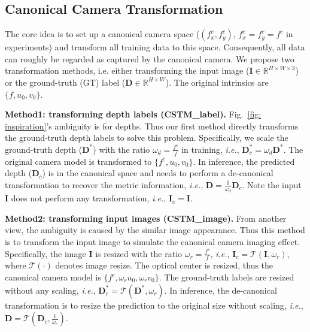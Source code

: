 \subsection{Canonical Camera Transformation}
The core idea is to set up a canonical camera space ($(f_{x}^{c}, f_{y}^{c})$, $f_{x}^{c}=f_{y}^{c}=f^{c}$ in experiments) and transform all training data to this space. 
Consequently, all data can roughly be regarded as captured by the canonical camera.
We propose two transformation methods, i.e. either transforming the input image ($\mathbf{I}\in\mathbb{R}^{H \times W \times 3}$) or the ground-truth (GT) label ($\mathbf{D}\in\mathbb{R}^{H \times W}$). The original intrinsics are $\{f, u_{0}, v_{0}\}$.

\noindent\textbf{Method1: transforming depth labels (CSTM\_label).}
Fig.~\ref{fig: inspiration}'s ambiguity is for depths. 
Thus our first method directly transforms the ground-truth depth labels to solve this problem.  Specifically, we scale the ground-truth depth ($\mathbf{D}^{*}$) with the ratio $\omega_d = \frac{f^{c}}{f}$ in training, \textit{i.e.},  $\mathbf{D}^{*}_{c} = \omega_d \mathbf{D}^{*}$. The original camera model is transformed to $\{f^{c}, u_{0}, v_{0}\}$. In inference, the predicted depth ($\mathbf{D}_{c}$) is in the canonical space and needs to perform a de-canonical transformation to recover the metric information, \textit{i.e.}, $\mathbf{D} = \frac{1}{\omega_d}\mathbf{D}_{c}$. Note the input $\mathbf{I}$ does not perform any transformation, \textit{i.e.},  $\mathbf{I}_c = \mathbf{I}$.

\noindent\textbf{Method2: transforming input images (CSTM\_image).}
From another view, the ambiguity is caused by the similar image appearance. Thus this method is to transform the input image to simulate the canonical camera imaging effect.
Specifically, the image $\mathbf{I}$ is resized with the ratio $\omega_r=\frac{f^{c}}{f}$, \textit{i.e.},
$\mathbf{I}_{c} = \mathcal{T}(\mathbf{I}, \omega_r)$, where $\mathcal{T}(\cdot)$ denotes image resize. The optical center is resized, thus the canonical camera model is $\{f^{c}, \omega_r u_{0}, \omega_r v_{0}\}$. The ground-truth labels are resized without any scaling, \textit{i.e.}, 
$\mathbf{D}^{*}_{c} = \mathcal{T}(\mathbf{D}^*, \omega_r)$. In inference, the de-canonical transformation is to resize the prediction to the original size without scaling, \textit{i.e.}, $\mathbf{D} = \mathcal{T}(\mathbf{D}_{c}, \frac{1}{\omega_r})$.

